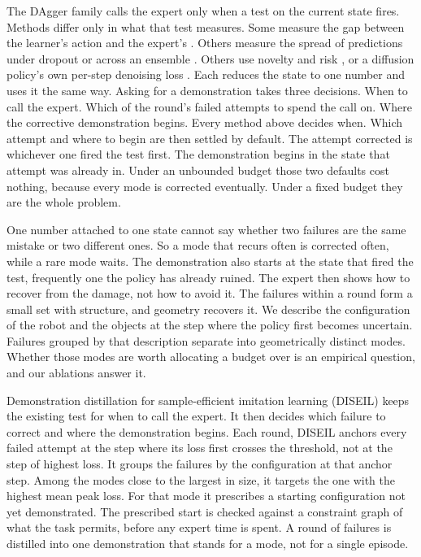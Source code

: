The DAgger family calls the expert only when a test on the current state fires.
Methods differ only in what that test measures. Some measure the gap between the
learner's action and the expert's \cite{zhang2017safedagger}. Others measure the
spread of predictions under dropout \cite{menda2017dropoutdagger} or across an
ensemble \cite{menda2019ensembledagger}. Others use novelty and risk
\cite{hoque2021thriftydagger}, or a diffusion policy's own per-step denoising loss
\cite{lee2025diffdagger,chi2023diffusionpolicy}. Each reduces the state to one
number and uses it the same way. Asking for a demonstration takes three decisions.
When to call the expert. Which of the round's failed attempts to spend the call
on. Where the corrective demonstration begins. Every method above decides when. Which
attempt and where to begin are then settled by default. The attempt corrected is
whichever one fired the test first. The demonstration begins in the state that
attempt was already in. Under an unbounded budget those two defaults cost nothing,
because every mode is corrected eventually. Under a fixed budget they are the
whole problem.

One number attached to one state cannot say whether two failures are the same
mistake or two different ones. So a mode that recurs often is corrected often,
while a rare mode waits. The demonstration also starts at the state that fired
the test, frequently one the policy has already ruined. The expert then shows how
to recover from the damage, not how to avoid it. The failures within a round form
a small set with structure, and geometry recovers it. We describe the
configuration of the robot and the objects at the step where the policy first
becomes uncertain. Failures grouped by that description separate into
geometrically distinct modes. Whether those modes are worth allocating a budget
over is an empirical question, and our ablations answer it.

Demonstration distillation for sample-efficient imitation learning (DISEIL) keeps
the existing test for when to call the expert. It then decides which failure to
correct and where the demonstration begins. Each round, DISEIL anchors every
failed attempt at the step where its loss first crosses the threshold, not at the
step of highest loss. It groups the failures by the configuration at that anchor
step. Among the modes close to the largest in size, it targets the one with the
highest mean peak loss. For that mode it prescribes a starting configuration not
yet demonstrated. The prescribed start is checked against a constraint graph of
what the task permits, before any expert time is spent. A round of failures is
distilled into one demonstration that stands for a mode, not for a single episode.


